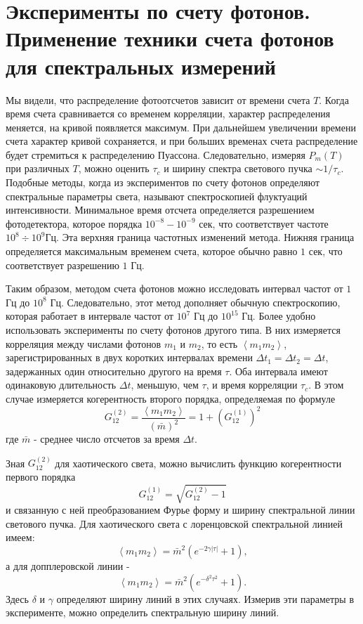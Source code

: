 \section{Эксперименты по счету фотонов. Применение техники счета
  фотонов для спектральных измерений}
Мы видели, что распределение фотоотсчетов зависит от времени счета
$T$. Когда время счета сравнивается со временем корреляции, характер
распределения меняется, на кривой появляется максимум. При дальнейшем
увеличении времени счета характер кривой сохраняется, и при больших
временах счета распределение будет стремиться к распределению
Пуассона. 
Следовательно, измеряя $P_m\left(T\right)$ при различных
$T$,  можно оценить $\tau_c$ и ширину спектра светового пучка $\sim
1/\tau_c$.  Подобные методы, когда из 
экспериментов по счету фотонов определяют спектральные параметры
света, называют спектроскопией флуктуаций интенсивности. Минимальное
время отсчета определяется разрешением фотодетектора, которое порядка
$10^{-8} - 10^{-9}$ сек,  что соответствует частоте $10^{8}\div
10^{9}$Гц.  Эта верхняя граница частотных изменений метода. Нижняя
граница определяется максимальным временем счета, которое обычно равно
$1$ сек, что соответствует разрешению  $1$ Гц. 

Таким образом, методом счета фотонов можно исследовать интервал частот
от $1$ Гц до $10^8$ Гц.  Следовательно, этот метод дополняет обычную 
спектроскопию, которая работает в интервале частот от $10^7$ Гц  до
$10^{15}$ Гц.  Более удобно использовать эксперименты по счету фотонов
другого типа. В них измеряется корреляция между числами фотонов $m_1$  и
$m_2$,  то есть $\left<m_1 m_2\right>$,  зарегистрированных в двух
коротких интервалах времени $\Delta t_1 = \Delta t_2 = \Delta t$,
задержанных один относительно другого на время $\tau$.  Оба интервала 
имеют одинаковую длительность $\Delta t$,  меньшую, чем $\tau$,  и
время корреляции $\tau_c$.  В этом случае измеряется когерентность второго порядка,
определяемая по формуле 
\[
G_{12}^{(2)} = \frac{\left<m_1 m_2\right>}{\left(\bar{m}\right)^2} = 
1 + \left(G_{12}^{(1)}\right)^2
\]
где $\bar{m}$ -  среднее число отсчетов за время $\Delta t$. 

Зная $G_{12}^{(2)}$ для хаотического света, можно вычислить функцию
когерентности первого порядка  
\[
G_{12}^{(1)} = \sqrt{G_{12}^{(2)} - 1}
\]
и связанную с ней преобразованием Фурье
форму и ширину спектральной линии светового пучка. Для хаотического света с
лоренцовской спектральной линией имеем: 
\begin{equation}
\left<m_1 m_2\right> = \bar{m}^2\left(e^{-2 \gamma \left|\tau\right|}
+ 1\right),
\label{eqCh4_68}
\end{equation}
а для допплеровской линии -
\begin{equation}
\left<m_1 m_2\right> = \bar{m}^2\left(e^{-\delta^2 \tau^2}
+ 1\right).
\label{eqCh4_69}
\end{equation}
Здесь $\delta$  и $\gamma$ определяют ширину линий в этих
случаях. Измерив эти параметры в эксперименте, можно определить
спектральную ширину линий. 
